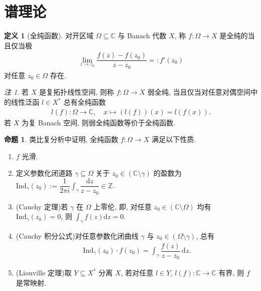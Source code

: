 \documentclass{MainStyle}
\theoremstyle{definition}
\theoremstyle{definition}
\theoremstyle{definition}
\newtheorem{definition}{定义}
\theoremstyle{definition}
\newtheorem{proposition}{命题}
\theoremstyle{definition}
\theoremstyle{definition}
\theoremstyle{definition}
\theoremstyle{remark}
\newtheorem{remark}{注}
\theoremstyle{remark}
\begin{document}
\section{谱理论}

\begin{definition}[全纯函数]
    对开区域 $\Omega\subseteq \mathbb C$ 与 Banach 代数 $X$, 称 $f:\Omega\to X$ 是全纯的当且仅当极
    \begin{align*}
        \lim_{z\to z_0}\dfrac{f(z)-f(z_0)}{z-z_0}=:f'(z_0)
    \end{align*}
    对任意 $z_0\in \Omega$ 存在.
\end{definition}

\begin{remark}
    若 $X$ 是复拓扑线性空间, 则称 $f:\Omega\to X$ 弱全纯, 当且仅当对任意对偶空间中的线性泛函 $l\in X^\ast$ 总有全纯函数
    \begin{align*}
        l(f):\Omega \to \mathbb C, \quad x\mapsto (l(f))(x)=l(f(x)).
    \end{align*}
    若 $X$ 为复 Banach 空间, 则弱全纯函数等价于全纯函数.
\end{remark}

\begin{proposition}
    类比复分析中证明, 全纯函数 $f:\Omega\to X$ 满足以下性质.
    \begin{enumerate}
        \item $f$ 光滑.
        \item 定义参数化闭道路 $\gamma\subseteq\Omega$ 关于 $z_0\in (\mathbb C\setminus \gamma)$ 的盈数为 $\displaystyle \mathrm{Ind}_\gamma (z_0):=\dfrac{1}{2\pi i}\int_\gamma\dfrac{\mathrm dz}{z-z_0}\in \mathbb Z$.
        \item (Cauchy 定理)若 $\gamma$ 在 $\Omega$ 上零伦, 即, 对任意 $z_0\in (\mathbb C\setminus\Omega)$ 均有 $\mathrm{Ind}_\gamma(z_0)=0$, 则 $\displaystyle \int_\gamma f(z)\mathrm dz=0$.
        \item (Cauchy 积分公式)对任意参数化闭曲线 $\gamma$ 与 $z_0\in (\Omega\setminus \gamma)$, 总有
              \begin{align*}
                  \mathrm{Ind}_\gamma(z_0)\cdot f(z_0) =\int_\gamma \dfrac{f(z)}{z-z_0}\,\mathrm dz.
              \end{align*}
        \item (Liouville 定理)取 $Y\subseteq X^\ast$ 分离 $X$, 若对任意 $l\in Y$, $l(f):\mathbb C\to \mathbb C$ 有界, 则 $f$ 是常映射.
    \end{enumerate}
\end{proposition}
\end{document}
